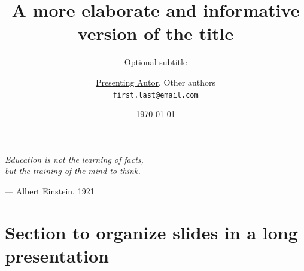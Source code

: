 \documentclass[aspectratio=169]{beamer}
\title[Short title]{A more elaborate and informative version of the title}
\author{\underline{Presenting Autor}, Other authors \\
\texttt{\scriptsize first.last@email.com} \\}
\subtitle[Subtitle]{Optional subtitle}
\institute{%
Venue \\[0em]
Your institute\\[0em]
Logos \\[0em]
}
\date{\today}
\begin{document}
\maketitle


{
\begin{frame}[plain]
\end{frame}
}

\begin{frame}[plain]
    \centering
    \begin{minipage}{9cm}
        \begin{center}
            \it\centering\large
            Education is not the learning of facts, \\
            but the training of the mind to think.
        \end{center}
        \flushright --- Albert Einstein, 1921 \qquad
    \end{minipage}
\end{frame}

\section{Section to organize slides in a long presentation}
\end{document}
